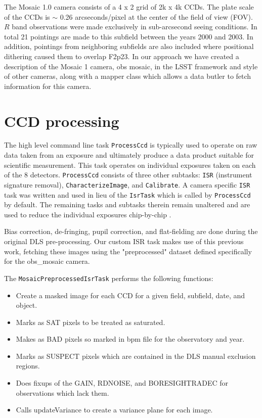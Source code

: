 \documentclass[DM,toc]{lsstdoc}
\begin{document}
The Mosaic 1.0 camera consists of a 4 x 2 grid of 2k x 4k CCDs. The plate scale of the CCDs is $\sim$ 0.26 arcseconds/pixel at the center of the field of view (FOV). $R$ band observations were made exclusively in sub-arcsecond seeing conditions. In total 21 pointings are made to this subfield between the years 2000 and 2003. In addition, pointings from neighboring subfields are also included where positional dithering caused them to overlap F2p23. In our approach we have created a description of the Mosaic 1 camera, obs mosaic, in the LSST framework and style of other cameras, along with a mapper class which allows a data butler to fetch information for this camera.

\section{CCD processing}
The high level command line task
{\tt\string ProcessCcd} is typically used to operate on raw data taken from an exposure and ultimately produce a data product suitable for scientific measurement. This task operates on individual exposures taken on each of the 8 detectors. {\tt\string ProcessCcd} consists of three other subtasks: {\tt\string ISR} (instrument signature removal), {\tt\string CharacterizeImage}, and {\tt\string Calibrate}. A camera specific {\tt\string ISR} task was written and used in lieu of the {\tt\string IsrTask} which is called by {\tt\string ProcessCcd} by default. The remaining tasks and subtasks therein remain unaltered and are used to reduce the individual exposures chip-by-chip \cite{2017arXiv170506766B}.

Bias correction, de-fringing, pupil correction, and flat-fielding are done during the original DLS pre-processing. Our custom ISR task makes use of this previous work, fetching these images using the "preprocessed" dataset defined specifically for the obs\_mosaic camera.

The {\tt\string MosaicPreprocessedIsrTask} performs the following functions:

\begin{itemize}
\item Create a masked image for each CCD for a given field, subfield, date, and object.
\item Marks as SAT pixels to be treated as saturated.
\item Makes as BAD pixels so marked in bpm file for the observatory and year.
\item Marks as SUSPECT pixels which are contained in the DLS manual exclusion regions.
\item Does fixups of the GAIN, RDNOISE, and BORESIGHTRADEC for observations which lack them.
\item Calls updateVariance to create a variance plane for each image.
\end{itemize}
\end{document}
